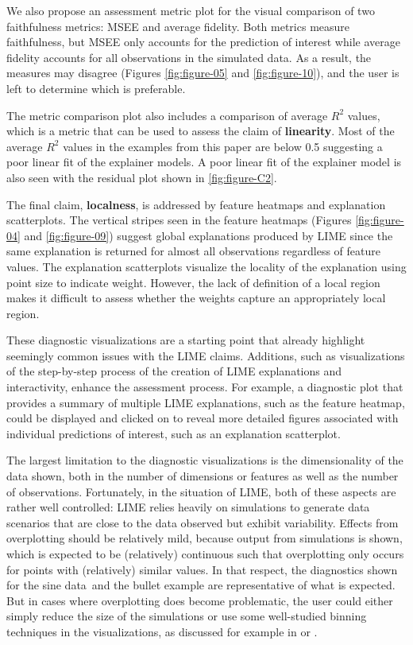 \documentclass[AMS,STIX2COL]{WileyNJD-v2}\usepackage[]{graphicx}\usepackage[]{color}
\newcommand{\data}{sine data}
\begin{document}
We also propose an assessment metric plot for the visual comparison of two faithfulness metrics: MSEE and average fidelity. Both metrics measure faithfulness, but MSEE only accounts for the prediction of interest while average fidelity accounts for all observations in the simulated data. As a result, the measures may disagree (Figures \ref{fig:figure-05} and \ref{fig:figure-10}), and the user is left to determine which is preferable. 

The metric comparison plot also includes a comparison of average $R^2$ values, which is a metric that can be used to assess the claim of \textbf{linearity}. Most of the average $R^2$ values in the examples from this paper are below 0.5 suggesting a poor linear fit of the explainer models. A poor linear fit of the explainer model is also seen with the residual plot shown in \autoref{fig:figure-C2}.

The final claim, \textbf{localness}, is addressed by  feature heatmaps and explanation scatterplots. The vertical stripes seen in the feature heatmaps (Figures \ref{fig:figure-04} and \ref{fig:figure-09}) suggest global explanations produced by LIME since the same explanation is returned for almost all observations regardless of feature values. The explanation scatterplots visualize the locality of the explanation using point size to indicate weight. However, the lack of definition of a local region makes it difficult to assess whether the weights capture an appropriately local region.



These diagnostic visualizations are a starting point that already highlight seemingly common issues with the LIME claims. Additions, such as visualizations of the step-by-step process of the creation of LIME explanations and  interactivity,  enhance the assessment process. For example, a diagnostic plot that provides a summary of multiple LIME explanations, such as the feature heatmap, could be displayed and clicked on to reveal more detailed figures associated with individual predictions of interest, such as an explanation scatterplot.

The largest limitation to the diagnostic visualizations is the dimensionality of the data shown, both in the number of dimensions or features as well as the number of observations. Fortunately, in the situation of LIME, both of these aspects are rather well controlled: LIME relies heavily on simulations to generate data scenarios that are close to the data observed but exhibit variability. Effects from overplotting should be relatively mild, because output from simulations is shown, which is expected to be (relatively) continuous such that overplotting only occurs for points with (relatively) similar values. In that respect, the diagnostics shown for the \data \ and the bullet example are representative of what is expected. But in cases where overplotting does become problematic, the user could either simply reduce the size of the simulations or use some well-studied binning techniques in the visualizations, as discussed for example in \citet{carr:1987} or \citet{unwin:2006}. 
\end{document}
